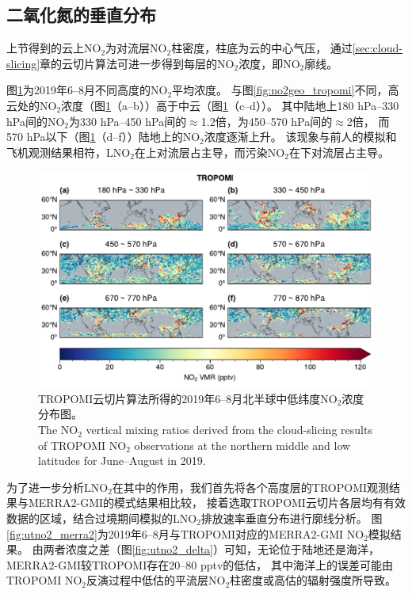 \subsection{二氧化氮的垂直分布}


上节得到的云上NO$_2$为对流层NO$_2$柱密度，柱底为云的中心气压，
通过\ref{sec:cloud-slicing}章的云切片算法可进一步得到每层的NO$_2$浓度，即NO$_2$廓线。

图\ref{fig:utno2_tropomi}为2019年6--8月不同高度的NO$_2$平均浓度。
与图\ref{fig:no2geo_tropomi}不同，高云处的NO$_2$浓度（图\ref{fig:utno2_tropomi}（a--b））高于中云（图\ref{fig:utno2_tropomi}（c--d））。
其中陆地上180 hPa--330 hPa间的NO$_2$为330 hPa--450 hPa间的$\approx$1.2倍，为450--570 hPa间的$\approx$2倍，
而570 hPa以下（图\ref{fig:utno2_tropomi}（d--f））陆地上的NO$_2$浓度逐渐上升。
该现象与前人的模拟和飞机观测结果相符，LNO$_2$在上对流层占主导，而污染NO$_2$在下对流层占主导\citep{Pickering.1996,Ott.2010,Laughner.2017}。


\begin{figure}[!htbp]
    \centering
    \includegraphics[width=15cm]{./figures/utno2_tropomi.pdf}
    \caption{
    TROPOMI云切片算法所得的2019年6--8月北半球中低纬度NO$_2$浓度分布图。 \\
    The NO$_2$ vertical mixing ratios derived from the cloud-slicing results of TROPOMI NO$_2$ observations at the northern middle and low latitudes for June--August in 2019.
    }
    \label{fig:utno2_tropomi}
\end{figure}


为了进一步分析LNO$_2$在其中的作用，我们首先将各个高度层的TROPOMI观测结果与MERRA2-GMI的模式结果相比较，
接着选取TROPOMI云切片各层均有有效数据的区域，结合过境期间模拟的LNO$_2$排放速率垂直分布进行廓线分析。
图\ref{fig:utno2_merra2}为2019年6--8月与TROPOMI对应的MERRA2-GMI NO$_2$模拟结果。
由两者浓度之差（图\ref{fig:utno2_delta}）可知，无论位于陆地还是海洋，MERRA2-GMI较TROPOMI存在20--80 pptv的低估，
其中海洋上的误差可能由TROPOMI NO$_2$反演过程中低估的平流层NO$_2$柱密度或高估的辐射强度所导致\citep{VanGeffen.2020}。


